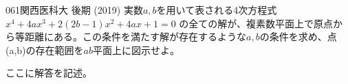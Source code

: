 \begin{thm}{061}{}{関西医科大 後期 (2019)}
 実数$a,b$を用いて表される4次方程式 $x^4+4ax^3+2(2b-1)x^2+4ax+1=0$ の全ての解が、複素数平面上で原点から等距離にある。この条件を満たす解が存在するような$a,b$の条件を求め、点(a,b)の存在範囲を$ab$平面上に図示せよ。
\end{thm}

ここに解答を記述。